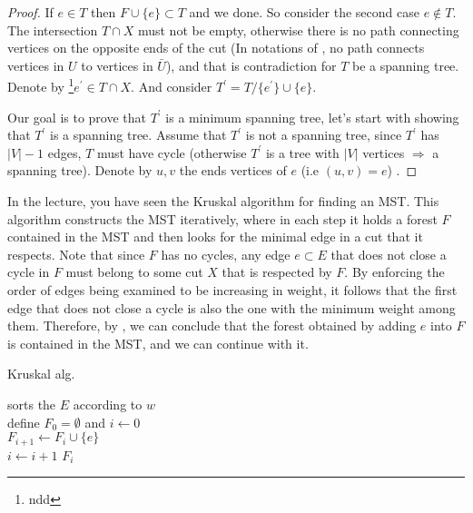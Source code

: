 \begin{proof}
  If $e \in T$ then $F \cup \{ e \} \subset T$ and we done. So consider the second case $ e \notin{T} $. The intersection $T\cap X$ must not be empty, otherwise there is no path connecting vertices on the opposite ends of the cut (In notations of , no path connects vertices in $U$ to vertices in $\bar{U}$), and that is contradiction for $T$ be a spanning tree. Denote by \footnote{ndd }$e^{\prime} \in T \cap X$. And consider $T^{\prime} = T / \{e^{\prime}\} \cup \{e\}$.

  Our goal is to prove that $T^{\prime}$ is a minimum spanning tree, let's start with showing that $T^{\prime}$ is a spanning tree. Assume that $T^{\prime}$ is not a spanning tree, since $T^{\prime}$ has $|V|-1$ edges, $T$ must have cycle (otherwise $T^{\prime}$ is a tree with $|V|$ vertices $\Rightarrow$ a spanning tree). Denote by $u,v$ the ends vertices of $e$ (i.e $(u,v) = e$) .   
\end{proof}


In the lecture, you have seen the Kruskal algorithm for finding an MST. This algorithm constructs the MST iteratively, where in each step it holds a forest $F$ contained in the MST and then looks for the minimal edge in a cut that it respects. Note that since $F$ has no cycles, any edge $e \subset E$ that does not close a cycle in $F$ must belong to some cut $X$ that is respected by $F$. By enforcing the order of edges being examined to be increasing in weight, it follows that the first edge that does not close a cycle is also the one with the minimum weight among them. Therefore, by , we can conclude that the forest obtained by adding $e$ into $F$ is contained in the MST, and we can continue with it.

\begin{algorithm}
\SetAlgoLined
{}
\caption{ Kruskal alg.}
sorts the $E$ according to $w$ \\
define $F_{0} = \emptyset$ and $i \leftarrow 0$ \\
 {
   {
    $F_{i+1} \leftarrow F_{i} \cup \{e\}$ \\
    $i \leftarrow i + 1$
  }
}
\Return $F_{i}$
\end{algorithm}




